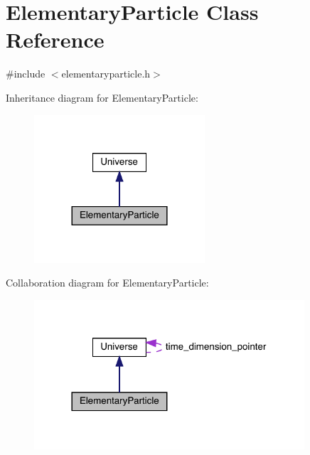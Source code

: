 \hypertarget{class_elementary_particle}{}\section{Elementary\+Particle Class Reference}
\label{class_elementary_particle}


{\ttfamily \#include $<$elementaryparticle.\+h$>$}



Inheritance diagram for Elementary\+Particle\+:\nopagebreak
\begin{figure}[H]
\begin{center}
\leavevmode
\includegraphics[width=180pt]{class_elementary_particle__inherit__graph}
\end{center}
\end{figure}


Collaboration diagram for Elementary\+Particle\+:
\nopagebreak
\begin{figure}[H]
\begin{center}
\leavevmode
\includegraphics[width=285pt]{class_elementary_particle__coll__graph}
\end{center}
\end{figure}
